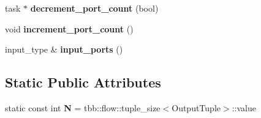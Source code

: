 \begin{DoxyCompactItemize}
\item 
\hypertarget{classinternal_1_1join__node__FE_3_01tag__matching_00_01InputTuple_00_01OutputTuple_01_4_a16ab2f00d8e1dc257d11086346cf176a}{}task $\ast$ {\bfseries decrement\+\_\+port\+\_\+count} (bool)\label{classinternal_1_1join__node__FE_3_01tag__matching_00_01InputTuple_00_01OutputTuple_01_4_a16ab2f00d8e1dc257d11086346cf176a}

\item 
\hypertarget{classinternal_1_1join__node__FE_3_01tag__matching_00_01InputTuple_00_01OutputTuple_01_4_ab24a1f5ca519094f6d3db9581ccba049}{}void {\bfseries increment\+\_\+port\+\_\+count} ()\label{classinternal_1_1join__node__FE_3_01tag__matching_00_01InputTuple_00_01OutputTuple_01_4_ab24a1f5ca519094f6d3db9581ccba049}

\item 
\hypertarget{classinternal_1_1join__node__FE_3_01tag__matching_00_01InputTuple_00_01OutputTuple_01_4_aa024d3c79e266412ce5d724685a35b7f}{}input\+\_\+type \& {\bfseries input\+\_\+ports} ()\label{classinternal_1_1join__node__FE_3_01tag__matching_00_01InputTuple_00_01OutputTuple_01_4_aa024d3c79e266412ce5d724685a35b7f}

\end{DoxyCompactItemize}
\subsection*{Static Public Attributes}
\begin{DoxyCompactItemize}
\item 
\hypertarget{classinternal_1_1join__node__FE_3_01tag__matching_00_01InputTuple_00_01OutputTuple_01_4_a6906fed11d638cdcee990354d0221c2b}{}static const int {\bfseries N} = tbb\+::flow\+::tuple\+\_\+size$<$Output\+Tuple$>$\+::value\label{classinternal_1_1join__node__FE_3_01tag__matching_00_01InputTuple_00_01OutputTuple_01_4_a6906fed11d638cdcee990354d0221c2b}

\end{DoxyCompactItemize}
